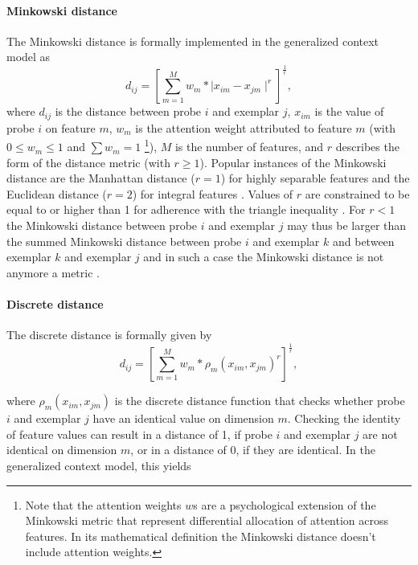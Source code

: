 \documentclass[a4paper,man,natbib]{apa6}
\begin{document}
\paragraph{Minkowski distance}
The Minkowski distance is formally implemented in the generalized context model as
\begin{equation}
d_{ij} = \left[\sum\limits_{m=1}^M w_{m}*\mid x_{im} - x_{jm}\mid ^r\right]^\frac{1}{r},
\end{equation}
where $d_{ij}$ is the distance between probe $i$ and exemplar $j$, $x_{im}$ is the value of probe $i$ on feature $m$, $w_{m}$ is the attention weight attributed to feature $m$ (with $0 \leq w_{m} \leq 1$ and $\sum w_{m} = 1$ \footnote{Note that the attention weights $w$s are a psychological extension of the Minkowski metric that represent differential allocation of attention across features. In its mathematical definition the Minkowski distance doesn't include attention weights.}), $M$ is the number of features, and $r$ describes the form of the distance metric (with $r \geq 1$). Popular instances of the Minkowski distance are the Manhattan distance ($r = 1$) for highly separable features and the Euclidean distance ($r = 2$) for integral features \citep{shepard1964attention, nosofsky1986attention, garner1974processing}. Values of $r$ are constrained to be equal to or higher than 1 for adherence with the triangle inequality \citep{jakel2008similarity,francois2007concentration,tversky1982similarity,beals1968foundations}. For $r < 1$ the Minkowski distance between probe $i$ and exemplar $j$ may thus be larger than the summed Minkowski distance between probe $i$ and exemplar $k$ and between exemplar $k$ and exemplar $j$ and in such a case the Minkowski distance is not anymore a metric \citep[][p. 5]{kress1989linear}. 

\paragraph{Discrete distance}
The discrete distance is formally given by 
\begin{equation}
d_{ij} = \left[\sum\limits_{m=1}^M w_{m}* \rho_{m}(x_{im}, x_{jm}) ^r\right]^\frac{1}{r},
\label{eq:distance}
\end{equation}

where $\rho_{m}(x_{im}, x_{jm})$ is the discrete distance function that checks whether probe $i$ and exemplar $j$ have an identical value on dimension $m$. Checking the identity of feature values can result in a distance of 1, if probe $i$ and exemplar $j$ are not identical on dimension $m$, or in a distance of 0, if they are identical. In the generalized context model, this yields
\end{document}
